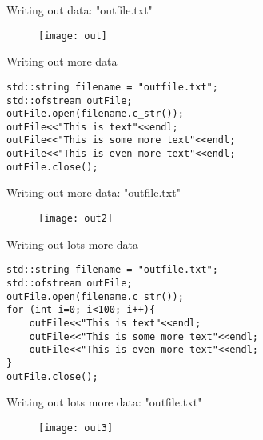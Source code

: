 \documentclass[xcolor={dvipsnames}]{beamer}
\begin{document}
\begin{frame}{Writing out data: "outfile.txt"}
	\begin{figure}
		\texttt{[image: out]}
	\end{figure}
\end{frame}

\begin{frame}[fragile]{Writing out more data}
\begin{verbatim}
std::string filename = "outfile.txt";
std::ofstream outFile;
outFile.open(filename.c_str());
outFile<<"This is text"<<endl;
outFile<<"This is some more text"<<endl;
outFile<<"This is even more text"<<endl;
outFile.close();
\end{verbatim}
\end{frame}


\begin{frame}{Writing out more data: "outfile.txt"}
	\begin{figure}
		\texttt{[image: out2]}
	\end{figure}
\end{frame}


\begin{frame}[fragile]{Writing out lots more data}
\begin{verbatim}
std::string filename = "outfile.txt";
std::ofstream outFile;
outFile.open(filename.c_str());
for (int i=0; i<100; i++){
    outFile<<"This is text"<<endl;
    outFile<<"This is some more text"<<endl;
    outFile<<"This is even more text"<<endl;
}
outFile.close();
\end{verbatim}
\end{frame}

\begin{frame}{Writing out lots more data: "outfile.txt"}
	\begin{figure}
		\texttt{[image: out3]}
	\end{figure}
\end{frame}
\end{document}
